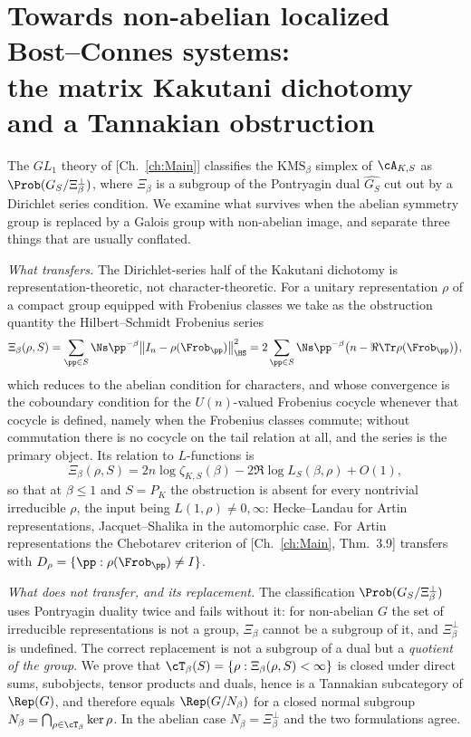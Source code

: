 \chapter[The non-abelian obstruction]{Towards non-abelian localized Bost--Connes systems:\\ the matrix Kakutani dichotomy and a Tannakian obstruction}\label{ch:VI}
\begin{summary}
The $GL_1$ theory of [Ch.~\ref{ch:Main}] classifies the $\mathrm{KMS}_\beta$ simplex of
$\cA_{K,S}$ as $\Prob(G_S/\Xi_\beta^\perp)$, where $\Xi_\beta$ is a subgroup of the
Pontryagin dual $\widehat{G_S}$ cut out by a Dirichlet series condition. We examine what
survives when the abelian symmetry group is replaced by a Galois group with non-abelian
image, and separate three things that are usually conflated.

\emph{What transfers.} The Dirichlet-series half of the Kakutani dichotomy is
representation-theoretic, not character-theoretic. For a unitary representation $\rho$ of a
compact group equipped with Frobenius classes we take as the obstruction quantity the
Hilbert--Schmidt Frobenius series
\[
\Xi_\beta(\rho,S)=\sum_{\pp\in S}\Ns\pp^{-\beta}\bigl\|I_n-\rho(\Frob_\pp)\bigr\|_{\HS}^2
=2\sum_{\pp\in S}\Ns\pp^{-\beta}\bigl(n-\Re\Tr\rho(\Frob_\pp)\bigr),
\]
which reduces to the abelian condition for characters, and whose convergence is the
coboundary condition for the $U(n)$-valued Frobenius cocycle whenever that cocycle is
defined, namely when the Frobenius classes commute; without commutation there is no
cocycle on the tail relation at all, and the series is the primary object. Its relation
to $L$-functions is
\[
\Xi_\beta(\rho,S)=2n\log\zeta_{K,S}(\beta)-2\Re\log L_S(\beta,\rho)+O(1),
\]
so that at $\beta\le1$ and $S=P_K$ the obstruction is absent for every nontrivial
irreducible $\rho$, the input being $L(1,\rho)\ne0,\infty$: Hecke--Landau for Artin
representations, Jacquet--Shalika in the automorphic case. For Artin representations the
Chebotarev criterion of [Ch.~\ref{ch:Main}, Thm.~3.9] transfers with
$D_\rho=\{\pp:\rho(\Frob_\pp)\ne I\}$.

\emph{What does not transfer, and its replacement.} The classification
$\Prob(G_S/\Xi_\beta^\perp)$ uses Pontryagin duality twice and fails without it: for
non-abelian $G$ the set of irreducible representations is not a group, $\Xi_\beta$ cannot be
a subgroup of it, and $\Xi_\beta^\perp$ is undefined. The correct replacement is not a
subgroup of a dual but a \emph{quotient of the group}. We prove that
$\cT_\beta(S)=\{\rho:\Xi_\beta(\rho,S)<\infty\}$ is closed under direct sums, subobjects,
tensor products and duals, hence is a Tannakian subcategory of $\Rep(G)$, and therefore
equals $\Rep(G/N_\beta)$ for a closed normal subgroup $N_\beta=\bigcap_{\rho\in\cT_\beta}\ker\rho$.
In the abelian case $N_\beta=\Xi_\beta^\perp$ and the two formulations agree.


\end{summary}
